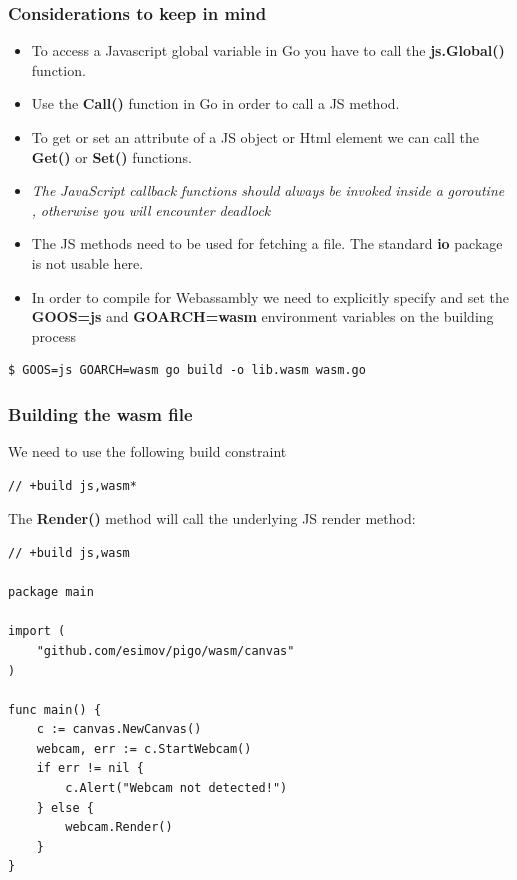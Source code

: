 \documentclass[9pt]{beamer}
\begin{document}
\begin{frame}[fragile]
\frametitle{Considerations to keep in mind}


\begin{itemize}
\item To access a Javascript global variable in Go you have to call the \textbf{js.Global()} function.
\item Use the \textbf{Call()} function in Go in order to call a JS method.
\item To get or set an attribute of a JS object or Html element we can call the \textbf{Get()} or \textbf{Set()} functions.
\item \emph{The} \emph{JavaScript} \emph{callback} \emph{functions} \emph{should} \emph{always} \emph{be} \emph{invoked} \emph{inside} \emph{a} \emph{goroutine ,} \emph{otherwise} \emph{you} \emph{will} \emph{encounter} \emph{deadlock}
\item The JS methods need to be used for fetching a file. The standard \textbf{io} package is not usable here.
\item In order to compile for Webassambly we need to explicitly specify and set the \textbf{GOOS=js} and \textbf{GOARCH=wasm} environment variables on the building process
\end{itemize}


\begin{verbatim}
$ GOOS=js GOARCH=wasm go build -o lib.wasm wasm.go

\end{verbatim}



\end{frame}

\begin{frame}[fragile]
\frametitle{Building the wasm file}


We need to use the following build constraint



\begin{verbatim}
// +build js,wasm*

\end{verbatim}


The \textbf{Render()} method will call the underlying JS render method:



\begin{verbatim}
// +build js,wasm

package main

import (
    "github.com/esimov/pigo/wasm/canvas"
)

func main() {
    c := canvas.NewCanvas()
    webcam, err := c.StartWebcam()
    if err != nil {
        c.Alert("Webcam not detected!")
    } else {
        webcam.Render()
    }
}

\end{verbatim}



\end{frame}
\end{document}
